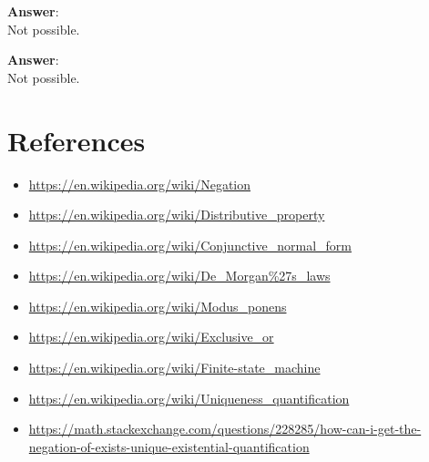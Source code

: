 \documentclass[a4paper, 14pt]{report}
\newcommand{\answer}[1]{%
	\begin{flushleft}
		\textbf{Answer}:\\
			#1
	\end{flushleft}}
\begin{document}
\answer{Not possible.} 
\answer{Not possible.} 

\pagebreak

\section*{References}

\begin{itemize}[noitemsep]		
  \item \url{https://en.wikipedia.org/wiki/Negation}
	\item \url{https://en.wikipedia.org/wiki/Distributive\_property}
	\item \url{https://en.wikipedia.org/wiki/Conjunctive\_normal\_form}
	\item \url{https://en.wikipedia.org/wiki/De\_Morgan\%27s\_laws}
	\item \url{https://en.wikipedia.org/wiki/Modus\_ponens}
	\item \url{https://en.wikipedia.org/wiki/Exclusive\_or}
	\item \url{https://en.wikipedia.org/wiki/Finite-state\_machine}
	\item \url{https://en.wikipedia.org/wiki/Uniqueness\_quantification}
	\item \url{https://math.stackexchange.com/questions/228285/how-can-i-get-the-negation-of-exists-unique-existential-quantification}
\end{itemize}		
\end{document}
